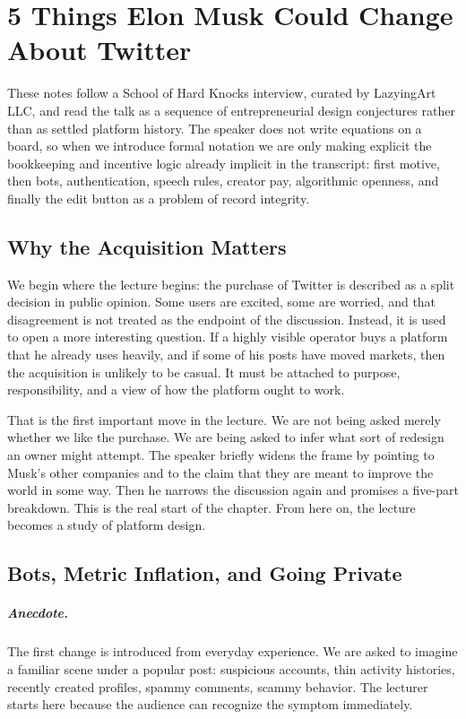 \chapter{5 Things Elon Musk Could Change About Twitter}

These notes follow a School of Hard Knocks interview, curated by LazyingArt LLC, and read the talk as a sequence of entrepreneurial design conjectures rather than as settled platform history. The speaker does not write equations on a board, so when we introduce formal notation we are only making explicit the bookkeeping and incentive logic already implicit in the transcript: first motive, then bots, authentication, speech rules, creator pay, algorithmic openness, and finally the edit button as a problem of record integrity.

\section{Why the Acquisition Matters}

We begin where the lecture begins: the purchase of Twitter is described as a split decision in public opinion. Some users are excited, some are worried, and that disagreement is not treated as the endpoint of the discussion. Instead, it is used to open a more interesting question. If a highly visible operator buys a platform that he already uses heavily, and if some of his posts have moved markets, then the acquisition is unlikely to be casual. It must be attached to purpose, responsibility, and a view of how the platform ought to work.

That is the first important move in the lecture. We are not being asked merely whether we like the purchase. We are being asked to infer what sort of redesign an owner might attempt. The speaker briefly widens the frame by pointing to Musk's other companies and to the claim that they are meant to improve the world in some way. Then he narrows the discussion again and promises a five-part breakdown. This is the real start of the chapter. From here on, the lecture becomes a study of platform design.

\section{Bots, Metric Inflation, and Going Private}

\paragraph{Anecdote.}
The first change is introduced from everyday experience. We are asked to imagine a familiar scene under a popular post: suspicious accounts, thin activity histories, recently created profiles, spammy comments, scammy behavior. The lecturer starts here because the audience can recognize the symptom immediately.

